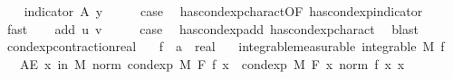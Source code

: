 \begin{isabellebody}
\isamarkupfalse%
\isanewline
\ \ \isamarkupfalse%
\ {\isacharparenleft}{\kern0pt}indicator\ A\ y{\isacharparenright}{\kern0pt}\isanewline
\ \ \isamarkupfalse%
\ \isamarkupfalse%
\ {\isacharquery}{\kern0pt}case\ \isamarkupfalse%
\ has{\isacharunderscore}{\kern0pt}cond{\isacharunderscore}{\kern0pt}exp{\isacharunderscore}{\kern0pt}charact{\isacharbrackleft}{\kern0pt}OF\ has{\isacharunderscore}{\kern0pt}cond{\isacharunderscore}{\kern0pt}exp{\isacharunderscore}{\kern0pt}indicator{\isacharbrackright}{\kern0pt}\ \isamarkupfalse%
\ fast\isanewline
{}\isamarkupfalse%
\isanewline
\ \ \isamarkupfalse%
\ {\isacharparenleft}{\kern0pt}add\ u\ v{\isacharparenright}{\kern0pt}\isanewline
\ \ \isamarkupfalse%
\ \isamarkupfalse%
\ {\isacharquery}{\kern0pt}case\ \isamarkupfalse%
\ has{\isacharunderscore}{\kern0pt}cond{\isacharunderscore}{\kern0pt}exp{\isacharunderscore}{\kern0pt}add\ has{\isacharunderscore}{\kern0pt}cond{\isacharunderscore}{\kern0pt}exp{\isacharunderscore}{\kern0pt}charact{\isacharparenleft}{\kern0pt}{}{\isacharparenright}{\kern0pt}\ \isamarkupfalse%
\ blast\isanewline
{}\isamarkupfalse%
%
\endisatagproof
{\isafoldproof}%
%
\isadelimproof
\isanewline
%
\endisadelimproof
\isanewline
{}\isamarkupfalse%
\ cond{\isacharunderscore}{\kern0pt}exp{\isacharunderscore}{\kern0pt}contraction{\isacharunderscore}{\kern0pt}real{\isacharcolon}{\kern0pt}\isanewline
\ \ \ f\ {\isacharcolon}{\kern0pt}{\isacharcolon}{\kern0pt}\ {\isachardoublequoteopen}{\isacharprime}{\kern0pt}a\ {\isasymRightarrow}\ real{\isachardoublequoteclose}\isanewline
\ \ \ integrable{\isacharbrackleft}{\kern0pt}measurable{\isacharbrackright}{\kern0pt}{\isacharcolon}{\kern0pt}\ {\isachardoublequoteopen}integrable\ M\ f{\isachardoublequoteclose}\isanewline
\ \ \ {\isachardoublequoteopen}AE\ x\ in\ M{\isachardot}{\kern0pt}\ norm\ {\isacharparenleft}{\kern0pt}cond{\isacharunderscore}{\kern0pt}exp\ M\ F\ f\ x{\isacharparenright}{\kern0pt}\ {\isasymle}\ cond{\isacharunderscore}{\kern0pt}exp\ M\ F\ {\isacharparenleft}{\kern0pt}{\isasymlambda}x{\isachardot}{\kern0pt}\ norm\ {\isacharparenleft}{\kern0pt}f\ x{\isacharparenright}{\kern0pt}{\isacharparenright}{\kern0pt}\ x{\isachardoublequoteclose}\isanewline
%
\isadelimproof
%
\endisadelimproof
%
\isatagproof
{}\isamarkupfalse%
{\isacharminus}{\kern0pt}\isanewline

\end{isabellebody}
